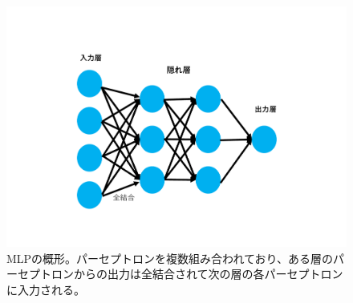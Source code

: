 \begin{figure}[tb]
  \centering
  \vspace{-3cm}
  \includegraphics[clip, width=13cm]{fig/4/MLP_re.pdf}
  \vspace{-1cm}
  \caption{MLPの概形。パーセプトロンを複数組み合われており、ある層のパーセプトロンからの出力は全結合されて次の層の各パーセプトロンに入力される。}
  \label{fig:MLP}
\end{figure}

